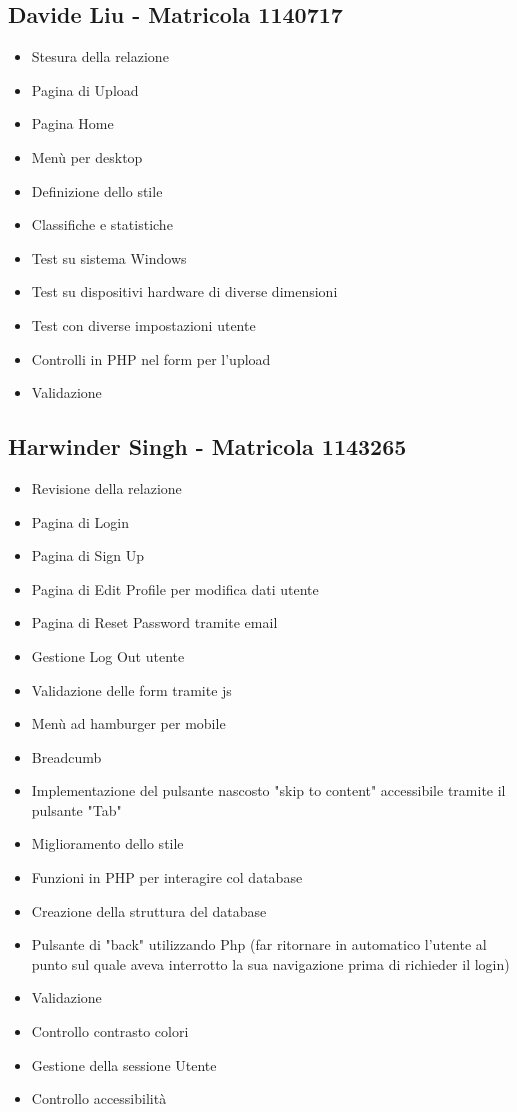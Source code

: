 \documentclass[openany, a4paper, 12pt]{report}
\begin{document}
	\subsection{Davide Liu - Matricola 1140717}
	\begin{itemize}
		\item Stesura della relazione
		\item Pagina di Upload
		\item Pagina Home
		\item Menù per desktop
		\item Definizione dello stile
		\item Classifiche e statistiche
		\item Test su sistema Windows
		\item Test su dispositivi hardware di diverse
		 dimensioni
		\item Test con diverse impostazioni utente
		\item Controlli in PHP nel form per l'upload
		\item Validazione
	\end{itemize}
	\subsection{Harwinder Singh - Matricola 1143265}
	\begin{itemize}
		\item Revisione della relazione
		\item Pagina di Login
		\item Pagina di Sign Up
		\item Pagina di Edit Profile per modifica dati utente
		\item Pagina di Reset Password tramite email
		\item Gestione Log Out utente
		\item Validazione delle form tramite js
		\item Menù ad hamburger per mobile
		\item Breadcumb
		\item Implementazione del pulsante nascosto "skip to content" accessibile tramite il pulsante "Tab" 
		\item Miglioramento dello stile
		\item Funzioni in PHP per interagire col database
		\item Creazione della struttura del database
		\item Pulsante di "back" utilizzando Php (far ritornare in automatico l'utente al punto sul quale aveva interrotto la sua navigazione prima di richieder il login)
		\item Validazione 
		\item Controllo contrasto colori
		\item Gestione della sessione Utente
		\item Controllo accessibilità
	\end{itemize}
\end{document}
